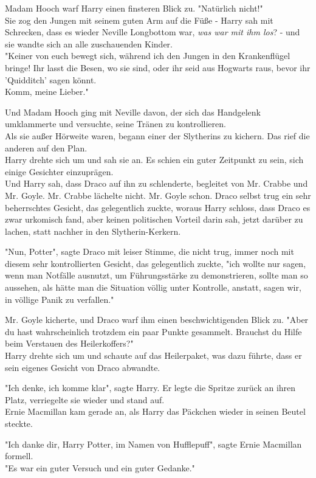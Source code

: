 {Madam Hooch warf Harry einen finsteren Blick zu. "Natürlich nicht!"\\ Sie zog den Jungen mit seinem guten Arm auf die Füße - Harry sah mit Schrecken, dass es wieder Neville Longbottom war, \emph{was war mit ihm los}? - und sie wandte sich an alle zuschauenden Kinder.\\ "Keiner von euch bewegt sich, während ich den Jungen in den Krankenflügel bringe! Ihr lasst die Besen, wo sie sind, oder ihr seid aus Hogwarts raus, bevor ihr 'Quidditch' sagen könnt.\\ Komm, meine Lieber."

Und Madam Hooch ging mit Neville davon, der sich das Handgelenk umklammerte und versuchte, seine Tränen zu kontrollieren.\\ Als sie außer Hörweite waren, begann einer der Slytherins zu kichern. Das rief die anderen auf den Plan.\\ Harry drehte sich um und sah sie an. Es schien ein guter Zeitpunkt zu sein, sich einige Gesichter einzuprägen.\\ Und Harry sah, dass Draco auf ihn zu schlenderte, begleitet von Mr. Crabbe und Mr. Goyle. Mr. Crabbe lächelte nicht. Mr. Goyle schon. Draco selbst trug ein sehr beherrschtes Gesicht, das gelegentlich zuckte, woraus Harry schloss, dass Draco es zwar urkomisch fand, aber keinen politischen Vorteil darin sah, jetzt darüber zu lachen, statt nachher in den Slytherin-Kerkern.

"Nun, Potter", sagte Draco mit leiser Stimme, die nicht trug, immer noch mit diesem sehr kontrollierten Gesicht, das gelegentlich zuckte, "ich wollte nur sagen, wenn man Notfälle ausnutzt, um Führungsstärke zu demonstrieren, sollte man so aussehen, als hätte man die Situation völlig unter Kontrolle, anstatt, sagen wir, in völlige Panik zu verfallen."

Mr. Goyle kicherte, und Draco warf ihm einen beschwichtigenden Blick zu. "Aber du hast wahrscheinlich trotzdem ein paar Punkte gesammelt. Brauchst du Hilfe beim Verstauen des Heilerkoffers?"\\ Harry drehte sich um und schaute auf das Heilerpaket, was dazu führte, dass er sein eigenes Gesicht von Draco abwandte.

"Ich denke, ich komme klar", sagte Harry. Er legte die Spritze zurück an ihren Platz, verriegelte sie wieder und stand auf.\\ Ernie Macmillan kam gerade an, als Harry das Päckchen wieder in seinen Beutel steckte.

"Ich danke dir, Harry Potter, im Namen von Hufflepuff", sagte Ernie Macmillan formell.\\ "Es war ein guter Versuch und ein guter Gedanke."

}
